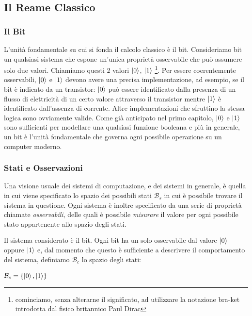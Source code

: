 \documentclass[12pt,a4paper,openright]{report}
\begin{document}
\subsection{Il Reame Classico}

\subsubsection{Il Bit}
L'unità fondamentale su cui si fonda il calcolo classico è il bit. Consideriamo bit un qualsiasi sistema che 
espone un'unica proprietà osservabile che può assumere solo due valori. Chiamiamo questi 2 valori $\ket0$, $\ket1$ \footnote{cominciamo, senza alterarne il significato, ad utilizzare la notazione bra-ket introdotta dal fisico britannico Paul Dirac}.
Per essere coerentemente osservabili, $\ket0$ e $\ket1$ devono avere una precisa implementazione, ad esempio, se il bit è indicato
da un transistor: $\ket0$ può essere identificato dalla presenza di un flusso di elettricità di un certo valore attraverso il transistor mentre
$\ket1$ è identificato dall'assenza di corrente. Altre implementazioni che sfruttino la stessa logica sono ovviamente valide. 
Come già anticipato nel primo capitolo, $\ket0$ e $\ket1$ sono sufficienti per modellare una qualsiasi
funzione booleana e più in generale, un bit è l'unità fondamentale che governa ogni possibile
operazione su un computer moderno.

\subsubsection{Stati e Osservazioni}

Una visione usuale dei sistemi di computazione, e dei sistemi in generale, è quella in cui viene specificato lo spazio dei possibili
stati $\mathcal{B}_s$ in cui è possibile trovare il sistema in questione. Ogni sistema è inoltre specificato da una serie di proprietà chiamate \emph{osservabili},
delle quali è possibile \emph{misurare} il valore per ogni possibile stato appartenente allo spazio degli stati. \par

Il sistema considerato è il bit. Ogni bit ha un solo osservabile dal valore $\ket0$ oppure $\ket1$ e, dal momento che questo è sufficiente a descrivere 
il comportamento del sistema, definiamo $\mathcal{B}_c$ lo spazio degli stati:
\begin{center}
    $ \mathcal{B}_c = \{\ket0, \ket1 \}$
\end{center}
\end{document}
